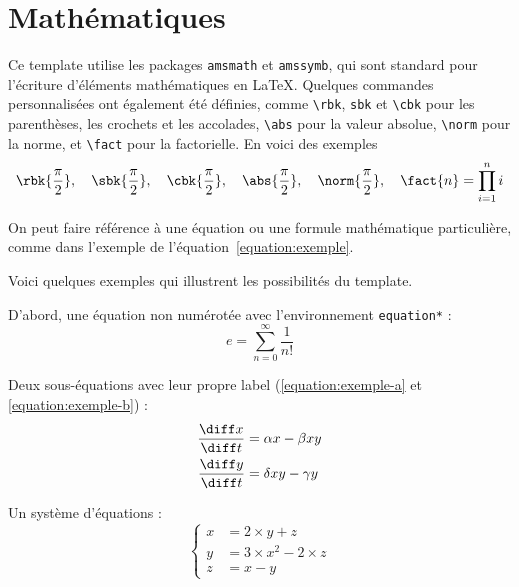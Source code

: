 \documentclass[a4paper, 12pt]{report}
\begin{document}
    \section{Mathématiques}\label{section:maths}
    Ce template utilise les packages \texttt{amsmath} et \texttt{amssymb}, qui sont standard pour l'écriture d'éléments mathématiques en \LaTeX{}. Quelques commandes personnalisées ont également été définies, comme \verb+\rbk+, \verb+sbk+ et \verb+\cbk+ pour les parenthèses, les crochets et les accolades, \verb+\abs+ pour la valeur absolue, \verb+\norm+ pour la norme, et \verb+\fact+ pour la factorielle. En voici des exemples
    $$
        \rbk{\frac{\pi}{2}}, \quad \sbk{\frac{\pi}{2}}, \quad \cbk{\frac{\pi}{2}}, \quad \abs{\frac{\pi}{2}}, \quad \norm{\frac{\pi}{2}}, \quad \fact{n} = \prod_{i = 1}^{n} i
    $$
    
    On peut faire référence à une équation ou une formule mathématique particulière, comme dans l'exemple de l'équation~\ref{equation:exemple}.


    

   

    Voici quelques exemples qui illustrent les possibilités du template.

D'abord, une équation non numérotée avec l'environnement \verb+equation*+ :
    \begin{equation*}
        e = \sum_{n=0}^\infty \frac{1}{n!}
    \end{equation*}

Deux sous-équations avec leur propre label (\ref{equation:exemple-a} et \ref{equation:exemple-b}) :
    \begin{subequations}
        \begin{align}
            \frac{\diff x}{\diff t} & = \alpha x - \beta xy\label{equation:exemple-a} \\
            \frac{\diff y}{\diff t} & = \delta xy - \gamma y\label{equation:exemple-b}
        \end{align}
    \end{subequations}

    Un système d'équations :
    \begin{equation}
        \left\{
        \begin{aligned}
            x & = 2 \times y + z \\
            y & = 3 \times x^2 - 2 \times z \\
            z & = x - y
        \end{aligned}
        \right.
    \end{equation}
\end{document}
